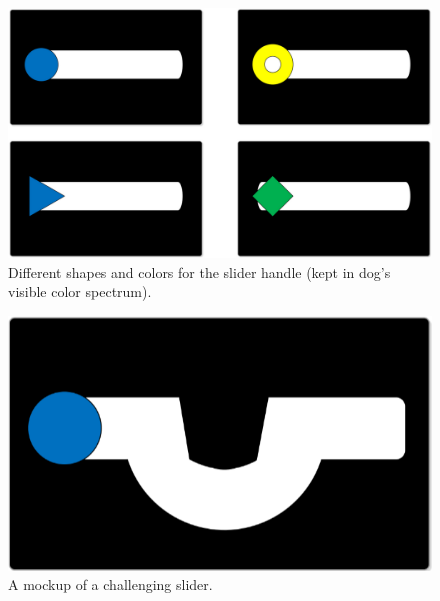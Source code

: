 \documentclass{sigchi}
\begin{document}
    \appendix
        \begin{figure}[h]
            \centering
            \includegraphics[width=\textwidth/2]{figures/slider_shapes.png}
            \caption{Different shapes and colors for the slider handle (kept in dog's visible color spectrum).}
            \label{fig:mockup1}
        \end{figure}
        \begin{figure}[h]
            \centering
            \includegraphics[width=\textwidth/4]{figures/curved-slider.png}
            \caption{A mockup of a challenging slider.}
            \label{fig:mockup2}
        \end{figure}
\end{document}
